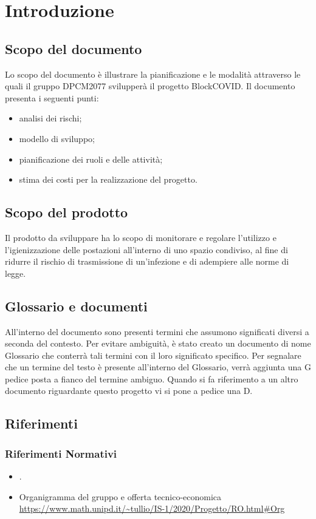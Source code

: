 \section{Introduzione}

\subsection{Scopo del documento}
Lo scopo del documento è illustrare la pianificazione e le modalità attraverso le quali il gruppo DPCM2077 svilupperà il progetto BlockCOVID.
Il documento presenta i seguenti punti:
\begin{itemize}
	\item analisi dei rischi;
	\item modello di sviluppo;
	\item pianificazione dei ruoli e delle attività;
	\item stima dei costi per la realizzazione del progetto.
\end{itemize}

\subsection{Scopo del prodotto}
Il prodotto da sviluppare ha lo scopo di monitorare e regolare l'utilizzo e l'igienizzazione delle postazioni all'interno di uno spazio condiviso, al fine di ridurre il rischio di trasmissione di un'infezione e di adempiere alle norme di legge. 
\subsection{Glossario e documenti} 
All'interno del  documento sono presenti termini che assumono significati diversi a seconda del contesto.
Per evitare ambiguità, è stato creato un  documento di nome Glossario che  conterrà tali termini con il loro significato specifico. Per segnalare che un termine del testo è presente all'interno del Glossario, verrà aggiunta una G pedice posta a fianco del termine ambiguo.
Quando si fa riferimento a un altro documento riguardante questo progetto vi si pone a pedice una D.

\subsection{Riferimenti}
\subsubsection{Riferimenti Normativi}
\begin{itemize}
	\item {}.
    \item{Organigramma del gruppo e offerta tecnico-economica} \\
 \url{https://www.math.unipd.it/~tullio/IS-1/2020/Progetto/RO.html#Org}
\end{itemize}
